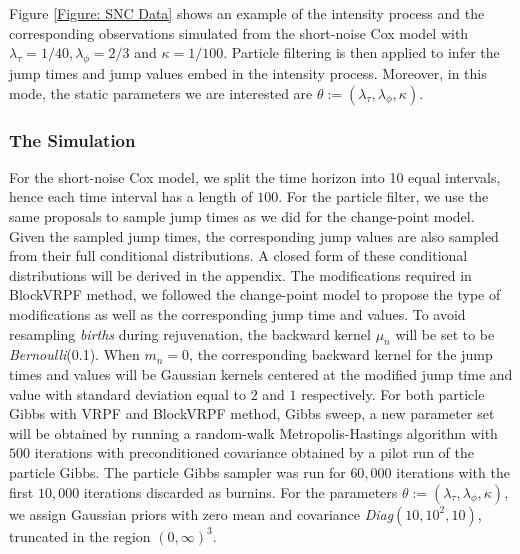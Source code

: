 \documentclass[12pt,a4paper]{article}
\begin{document}
Figure \ref{Figure: SNC Data} shows an example of the intensity process and the corresponding observations simulated from the short-noise Cox model with \(\lambda_\tau = 1/40, \lambda_\phi=2/3\) and \(\kappa=1/100\). Particle filtering is then applied to infer the jump times and jump values embed in the intensity process. Moreover, in this mode, the static parameters we are interested are \(\theta := (\lambda_\tau,\lambda_\phi,\kappa)\). 
\subsubsection{The Simulation}
For the short-noise Cox model, we split the time horizon into 10 equal intervals, hence each time interval has a length of \(100\). For the particle filter, we use the same proposals to sample jump times as we did for the change-point model. Given the sampled jump times, the corresponding jump values are also sampled from their full conditional distributions. A closed form of these conditional distributions will be derived in the appendix. The modifications required in BlockVRPF method, we followed the change-point model to propose the type of modifications as well as the corresponding jump time and values. To avoid resampling \textit{births} during rejuvenation, the backward kernel \(\mu_n\) will be set to be \textit{Bernoulli}(0.1). When \(m_n = 0\), the corresponding backward kernel for the jump times and values will be Gaussian kernels centered at the modified jump time and value with standard deviation equal to \(2\) and \(1\) respectively. For both particle Gibbs with VRPF and BlockVRPF method, Gibbs sweep, a new parameter set will be obtained by running a random-walk Metropolis-Hastings algorithm with \(500\) iterations with preconditioned covariance obtained by a pilot run of the particle Gibbs. The particle Gibbs sampler was run for \(60,000\) iterations with the first \(10,000\) iterations discarded as burnins. For the parameters \(\theta:=(\lambda_\tau,\lambda_\phi,\kappa)\), we assign Gaussian priors with zero mean and covariance \textit{Diag}\((10,10^2,10)\), truncated in the region \((0,\infty)^3\). 
\end{document}
